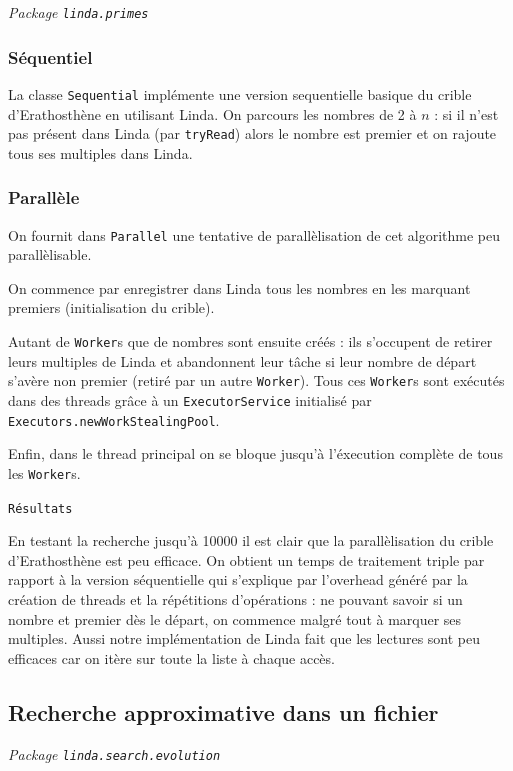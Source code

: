 \documentclass[headings=standardclasses,parskip=half]{scrartcl}
\begin{document}
\textit{Package \texttt{linda.primes}}

\subsubsection{Séquentiel}

La classe \texttt{Sequential} implémente une version sequentielle basique
du crible d'Erathosthène en utilisant Linda.
On parcours les nombres de 2 à \(n\) : si il n'est pas présent dans Linda
(par \texttt{tryRead}) alors le nombre est premier et on rajoute tous
ses multiples dans Linda.

\subsubsection{Parallèle}

On fournit dans \texttt{Parallel} une tentative de parallèlisation de
cet algorithme peu parallèlisable.

On commence par enregistrer dans Linda tous les nombres en les marquant
premiers (initialisation du crible).

Autant de \texttt{Worker}s que de nombres sont ensuite créés : ils
s'occupent de retirer leurs multiples de Linda et abandonnent leur
tâche si leur nombre de départ s'avère non premier (retiré par un autre
\texttt{Worker}).
Tous ces \texttt{Worker}s sont exécutés dans des
threads grâce à un \texttt{ExecutorService} initialisé par
\texttt{Executors.newWorkStealingPool}.

Enfin, dans le thread principal on se bloque jusqu'à
l'éxecution complète de tous les \texttt{Worker}s.

\texttt{Résultats}

En testant la recherche jusqu'à 10000 il est clair que la parallèlisation
du crible d'Erathosthène est peu efficace. On obtient un temps de traitement
triple par rapport à la version séquentielle qui s'explique par l'overhead
généré par la création de threads et la répétitions d'opérations : ne pouvant
savoir si un nombre et premier dès le départ, on commence malgré tout
à marquer ses multiples.
Aussi notre implémentation de Linda fait que les lectures sont peu efficaces
car on itère sur toute la liste à chaque accès.

\subsection{Recherche approximative dans un fichier}

\textit{Package \texttt{linda.search.evolution}}
\end{document}
